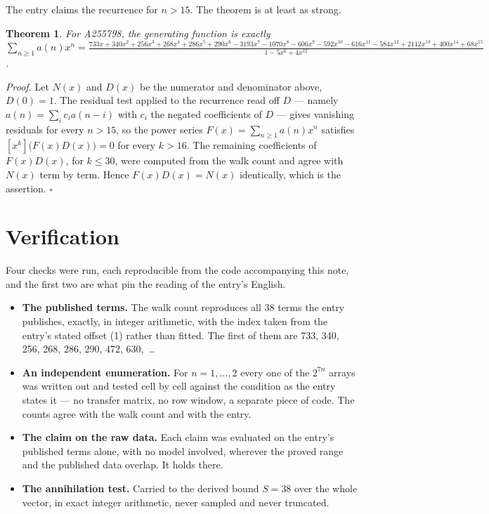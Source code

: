 \documentclass[11pt]{article}
\newtheorem{theorem}{Theorem}
\theoremstyle{definition}
\begin{document}
The entry claims the recurrence for $n > 15$. The theorem is at least as strong.

\begin{theorem} For A255798, the generating function is exactly $\sum_{n\ge 1} a(n)x^n = \frac{733x + 340x^{2} + 256x^{3} + 268x^{4} + 286x^{5} + 290x^{6} - 3193x^{7} - 1070x^{8} - 606x^{9} - 592x^{10} - 616x^{11} - 584x^{12} + 2112x^{13} + 400x^{14} + 68x^{15}}{1 - 5x^{6} + 4x^{12}}$.\end{theorem}

{\itshape Proof.} Let $N(x)$ and $D(x)$ be the numerator and denominator above, $D(0)=1$. The residual test applied to the recurrence read off $D$ --- namely $a(n) = \sum_i c_i a(n-i)$ with $c_i$ the negated coefficients of $D$ --- gives vanishing residuals for every $n > 15$, so the power series $F(x)=\sum_{n\ge 1}a(n)x^n$ satisfies $[x^k]\bigl(F(x)D(x)\bigr) = 0$ for every $k > 16$. The remaining coefficients of $F(x)D(x)$, for $k \le 30$, were computed from the walk count and agree with $N(x)$ term by term. Hence $F(x)D(x) = N(x)$ identically, which is the assertion. $\square$

\section{Verification}

Four checks were run, each reproducible from the code accompanying this note, and the first two are what pin the reading of the entry's English.

\begin{itemize}

\item {\bfseries The published terms.} The walk count reproduces all 38 terms the entry publishes, exactly, in integer arithmetic, with the index taken from the entry's stated offset (1) rather than fitted. The first of them are 733, 340, 256, 268, 286, 290, 472, 630,~\dots

\item {\bfseries An independent enumeration.} For $n = 1,\dots,2$ every one of the $2^{7n}$ arrays was written out and tested cell by cell against the condition as the entry states it --- no transfer matrix, no row window, a separate piece of code. The counts agree with the walk count and with the entry.

\item {\bfseries The claim on the raw data.} Each claim was evaluated on the entry's published terms alone, with no model involved, wherever the proved range and the published data overlap. It holds there.

\item {\bfseries The annihilation test.} Carried to the derived bound $S = 38$ over the whole vector, in exact integer arithmetic, never sampled and never truncated.

\end{itemize}
\end{document}
